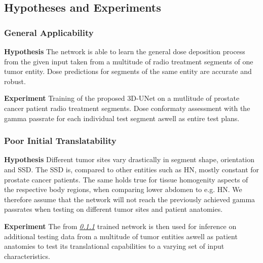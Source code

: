 \subsection{Hypotheses and Experiments}


\subsubsection{General Applicability}\label{sssec:H1}
\begin{hanginglist}\itemsep2pt

    \item\textbf{Hypothesis}\newline
    The network is able to learn the general dose deposition process from the given input taken from a multitude of radio treatment segments of one tumor entity. 
    Dose predictions for segments of the same entity are accurate and robust.

    \item\textbf{Experiment}\newline
    Training of the proposed 3D-UNet on a mutlitude of prostate cancer patient radio treatment segments. 
    Dose conformaty assessment with the gamma passrate for each individual test segment aswell as entire test plans. 

\end{hanginglist}

\subsubsection{Poor Initial Translatability}\label{sssec:H2}
\begin{hanginglist}\itemsep2pt

    \item\textbf{Hypothesis}\newline
    Different tumor sites vary drastically in segment shape, orientation and \ac{SSD}. The \acs{SSD} is, compared to other entities such as \acs{HN}, mostly constant for prostate cancer patients. The same holds true for tissue homogenity aspects of the respective body regions, when comparing lower abdomen to e.g. \acs{HN}. We therefore assume that the network will not reach the previously achieved gamma passrates when testing on different tumor sites and patient anatomies. 

    \item\textbf{Experiment}\newline
    The from \emph{\ref{sssec:H1} } trained network is then used for inference on additional testing data from a multitude of tumor entities aswell as patient anatomies to test its translational capabilities to a varying set of input characteristics. 

\end{hanginglist}

